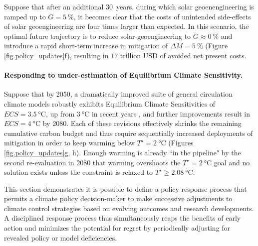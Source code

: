 \documentclass{article}
\begin{document}

Suppose that after an additional \SI{30}{years}, during which solar geoenengineering is ramped up to $G=\SI{5}{\%}$, it becomes clear that the costs of unintended side-effects of solar geoengineering are four times larger than expected. In this scenario, the optimal future trajectory is to reduce solar-geoengineering to $G \approx \SI{0}{\%}$ and introduce a rapid short-term increase in mitigation of $\Delta M = \SI{5}{\%}$ (Figure \ref{fig.policy_updates}f), resulting in $17$ trillion USD of avoided net present costs.

\paragraph{Responding to under-estimation of Equilibrium Climate Sensitivity.}
Suppose that by 2050, a dramatically improved suite of general circulation climate models robustly exhibits Equilibrium Climate Sensitivities of $ECS=\SI{3.5}{\celsius}$, up from $\SI{3}{\celsius}$ in recent years \citep{geoffroy_transient_2012}, and further improvements result in $ECS=\SI{4}{\celsius}$ by 2080. Each of these revisions effectively shrinks the remaining cumulative carbon budget and thus require sequentially increased deployments of mitigation in order to keep warming below $T^{\star} = \SI{2}{\celsius}$ (Figures \ref{fig.policy_updates}g, h). Enough warming is already ``in the pipeline" by the second re-evaluation in 2080 that warming overshoots the $T^{\star} = \SI{2}{\celsius}$ goal and no solution exists unless the constraint is relaxed to $T^{\star} \geq \SI{2.08}{\celsius}$.

This section demonstrates it is possible to define a policy response process that permits a climate policy decision-maker to make successive adjustments to climate control strategies based on evolving outcomes and research developments. A disciplined response process thus simultaneously reaps the benefits of early action and minimizes the potential for regret by periodically adjusting for revealed policy or model deficiencies.
\end{document}

